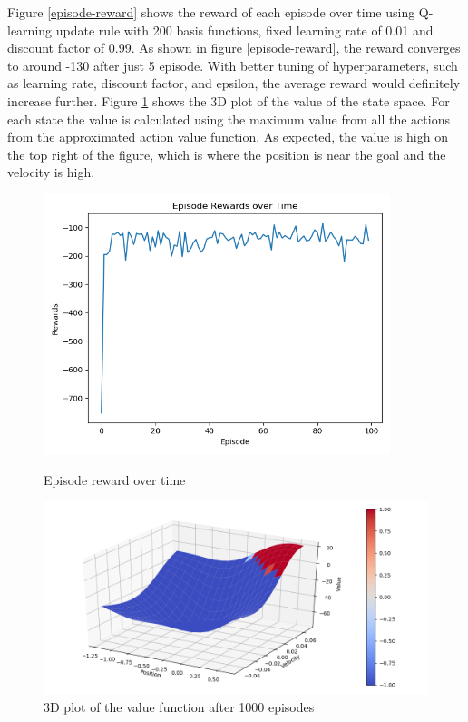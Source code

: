 \documentclass[12pt,letterpaper]{article}
\begin{document}
Figure \ref{episode-reward} shows the reward of each episode over time using Q-learning update rule
with 200 basis functions, fixed learning rate of 0.01 and discount factor of 0.99. 
As shown in figure \ref{episode-reward}, the reward converges to around -130 after just 5 episode.
With better tuning of hyperparameters, such as learning rate, discount factor, and epsilon, 
the average reward would definitely increase further. 
Figure \ref{value-plot} shows the 3D plot of the value of the state space. 
For each state the value is calculated using the maximum value from all the actions from the approximated action value function.
As expected, the value is high on the top right of the figure, which is where the position is near the goal and the velocity is high.

\begin{figure}[h]
  \centering
  \begin{minipage}{0.45\textwidth}
      \centering
      \includegraphics[width=0.9\textwidth]{q-online.png} %
      \caption{Episode reward over time}
      \label{episode-reward}
  \end{minipage}\hfill
  \begin{minipage}{0.55\textwidth}
      \centering
      \includegraphics[width=1\textwidth]{mountain-value.png} %
      \caption{3D plot of the value function after 1000 episodes}
      \label{value-plot}
  \end{minipage}
\end{figure}
\end{document}
